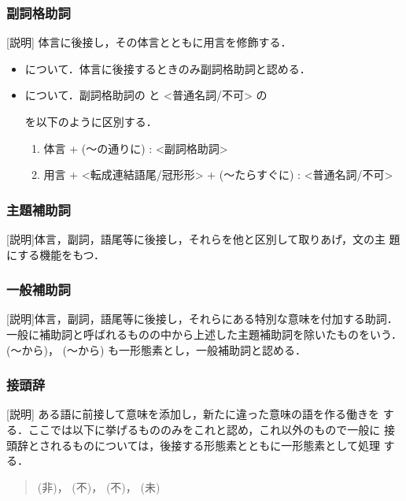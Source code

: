         
\subsubsection{副詞格助詞}        
[説明] 体言に後接し，その体言とともに用言を修飾する．

\begin{itemize}
\item {}
 について．体言に後接するときのみ副詞格助詞と認める．
\item {}
 について．副詞格助詞の 
 と <普通名詞/不可> の

を以下のように区別する．

    \begin{enumerate}
    \item 体言 + 
(〜の通りに) : <副詞格助詞>
    \item 用言 + <転成連結語尾/冠形形> + 
(〜たらすぐに)
          : <普通名詞/不可>
    \end{enumerate}
\end{itemize}
        
\subsubsection{主題補助詞}        
[説明]体言，副詞，語尾等に後接し，それらを他と区別して取りあげ，文の主
題にする機能をもつ．
        
\subsubsection{一般補助詞}        
[説明]体言，副詞，語尾等に後接し，それらにある特別な意味を付加する助詞．
一般に補助詞と呼ばれるものの中から上述した主題補助詞を除いたものをいう．
(〜から)，
(〜から) も一形態素とし，一般補助詞と認める．

        
\subsubsection{接頭辞}        
[説明] ある語に前接して意味を添加し，新たに違った意味の語を作る働きを
する．ここでは以下に挙げるもののみをこれと認め，これ以外のもので一般に
接頭辞とされるものについては，後接する形態素とともに一形態素として処理
する．

\begin{quote}        
(非)，
(不)，
(不)，
(未)
\end{quote}

